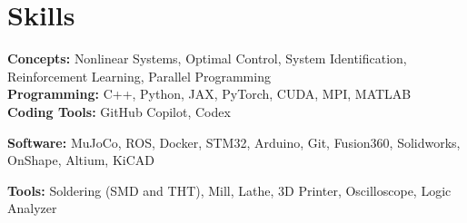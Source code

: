 \documentclass[letterpaper,11pt]{article}
\newcommand{\resumeSubHeadingListStart}{\begin{itemize}[leftmargin=0.15in, label={}]}
\newcommand{\resumeSubHeadingListEnd}{\end{itemize}}
\begin{document}

\section{Skills}
  \vspace{2pt}
  \resumeSubHeadingListStart
    \small{\item{
        \textbf{Concepts: }{Nonlinear Systems, Optimal Control, System Identification, Reinforcement Learning, Parallel Programming} \\ \vspace{3pt}
        \textbf{Programming: }{C++, Python, JAX, PyTorch, CUDA, MPI, MATLAB} \\ \vspace{3pt}
        \textbf{Coding Tools: }{GitHub Copilot, Codex} \\ \vspace{3pt}
        
        \textbf{Software: }{MuJoCo, ROS, Docker, STM32, Arduino, Git, Fusion360, Solidworks, OnShape, Altium, KiCAD} \\ \vspace{3pt}
        
        \textbf{Tools: }{Soldering (SMD and THT), Mill, Lathe, 3D Printer, Oscilloscope, Logic Analyzer}
        
    }}
  \resumeSubHeadingListEnd
\end{document}

